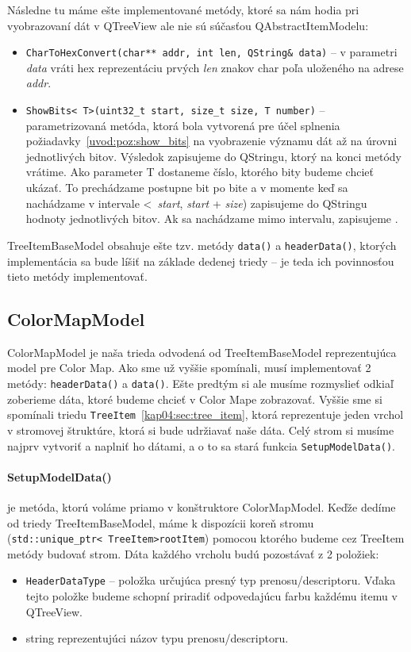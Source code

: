 Následne tu máme ešte implementované metódy, ktoré sa nám hodia pri vyobrazovaní dát v QTreeView ale nie sú súčasťou QAbstractItemModelu:
\begin{itemize}
\item \texttt{CharToHexConvert(char** addr, int len, QString\& data)} -- v parametri \textit{data} vráti hex reprezentáciu prvých \textit{len} znakov char poľa uloženého na adrese \textit{addr}.
\item \texttt{ShowBits\textless~T\textgreater(uint32\_t start, size\_t size, T number)}  -- parametrizovaná metóda, ktorá bola vytvorená pre účel splnenia požiadavky~\ref{uvod:poz:show_bits} na vyobrazenie významu dát až na úrovni jednotlivých bitov. Výsledok zapisujeme do QStringu, ktorý na konci metódy vrátime. Ako parameter T dostaneme číslo, ktorého bity budeme chcieť ukázať. To prechádzame postupne bit po bite a v momente keď sa nachádzame v intervale \textless~\textit{start}, \textit{start} + \textit{size}) zapisujeme do QStringu hodnoty jednotlivých bitov. Ak sa nachádzame mimo intervalu, zapisujeme .
\end{itemize}

TreeItemBaseModel obsahuje ešte tzv.  metódy \texttt{data()} a \newline\texttt{headerData()}, ktorých implementácia sa bude líšiť na základe dedenej triedy -- je teda ich povinnosťou tieto metódy implementovať.


\subsection{ColorMapModel}
ColorMapModel je naša trieda odvodená od TreeItemBaseModel reprezentujúca model pre Color Map. Ako sme už vyššie spomínali, musí implementovať 2 metódy: \texttt{headerData()} a \texttt{data()}. Ešte predtým si ale musíme rozmyslieť odkiaľ zoberieme dáta, ktoré budeme chcieť v Color Mape zobrazovať. Vyššie sme si spomínali triedu \texttt{TreeItem}~\ref{kap04:sec:tree_item}, ktorá reprezentuje jeden vrchol v stromovej štruktúre, ktorá si bude udržiavať naše dáta. Celý strom si musíme najprv vytvoriť a naplniť ho dátami, a o to sa stará funkcia \texttt{SetupModelData()}.

\paragraph{SetupModelData()} je metóda, ktorú voláme priamo v konštruktore ColorMapModel. Keďže dedíme od triedy TreeItemBaseModel, máme k dispozícii koreň stromu (\texttt{std::unique\_ptr\textless~TreeItem\textgreater rootItem}) pomocou ktorého budeme cez TreeItem metódy budovať strom. Dáta každého vrcholu budú pozostávať z 2 položiek:
\begin{itemize}
\item \texttt{HeaderDataType} -- položka určujúca presný typ prenosu/descriptoru. Vďa\-ka tejto položke budeme schopní priradiť odpovedajúcu farbu každému itemu v QTreeView.
\item string reprezentujúci názov typu prenosu/descriptoru.
\end{itemize}


